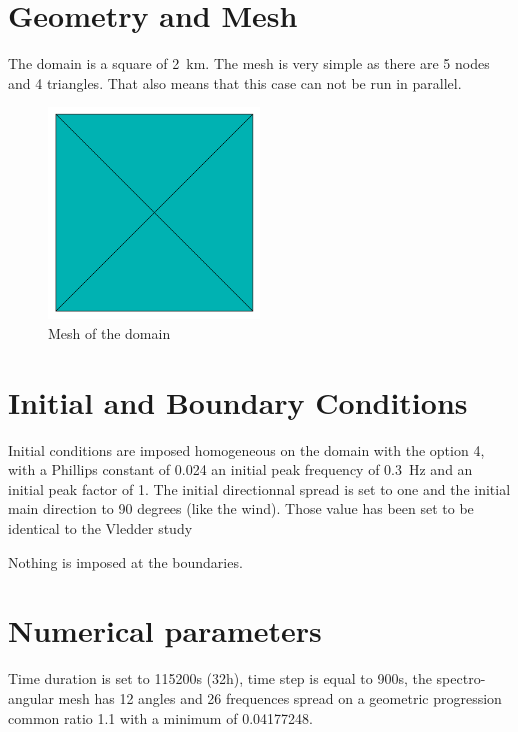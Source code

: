 \section{Geometry and Mesh}
%
The domain is a square of 2~km.
The mesh is very simple as there are 5 nodes and 4 triangles. That also means that this case can not be run in parallel.
\begin{figure} [!h]
\centering
\includegraphics[width=0.5\textwidth]{maillage.png}
 \caption{Mesh of the domain}
\label{mailTW}
\end{figure}
%
%
\section{Initial and Boundary Conditions}
%
Initial conditions are imposed homogeneous on the domain with the option 4, with a Phillips constant of 0.024 an initial peak frequency of 0.3~Hz  and an initial peak factor of 1.  The initial directionnal spread is set to one and the initial main direction to 90 degrees (like the wind).
Those value has been set to be identical to the Vledder study \cite{Vanvledder1990}

Nothing is imposed at the boundaries.
%
%
\section{Numerical parameters}
Time duration is set to 115200s (32h), time step is equal to 900s, the spectro-angular mesh has 12 angles and 26 frequences spread on a geometric progression common ratio 1.1 with a minimum of 0.04177248.

%
%
